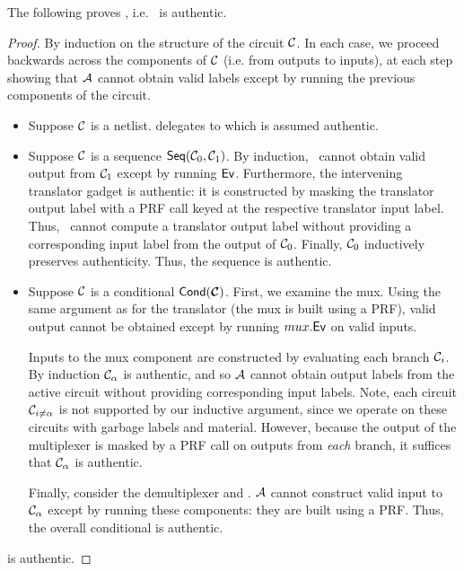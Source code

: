 The following proves , i.e. \ourschemelong\ is
authentic.
\begin{proof}
  By induction on the structure of the circuit $\mathcal C$.
  In each case, we proceed backwards across the components of $\mathcal C$ (i.e. from outputs to inputs), at
  each step showing that $\mathcal{A}$ cannot obtain valid labels
  except by running the previous components of the circuit.
  \begin{itemize}
    \item Suppose $\mathcal C$ is a netlist. \ourschemelong delegates to
      \underscheme which is assumed authentic.
    \item Suppose $\mathcal C$ is a sequence $\textsf{Seq}(\mathcal C_0, \mathcal C_1)$.
      By induction, \adv\ cannot obtain valid
      output from $\mathcal C_1$ except by running $\textsf{Ev}$.
      Furthermore, the intervening translator gadget is authentic: it
      is constructed by masking the translator output label with a PRF call
      keyed at the respective translator input label.
      Thus, \adv\ cannot compute a translator output label without providing
      a corresponding input label from the output of $\mathcal C_0$.
      Finally, $\mathcal C_0$ inductively preserves authenticity.
      Thus, the sequence is authentic.
    \item Suppose $\mathcal C$ is a conditional $\conditional(\vec{\cir})$.
      First, we examine the mux. Using the same argument as for the
      translator (the mux is built using a PRF), valid output cannot be obtained except by running $mux.\textsf{Ev}$ on valid inputs.

      Inputs to the mux component are constructed by evaluating
      each branch $\mathcal C_i$.
      By induction $\mathcal C_{\alpha}$ is authentic, and so $\mathcal{A}$ cannot
      obtain output labels from the active circuit without providing
      corresponding input labels.
      Note, each circuit $\mathcal C_{i \neq \alpha}$ is not supported by our
      inductive argument, since we operate on these circuits with
      garbage labels and material.
      However, because the output of the multiplexer is masked by a
      PRF call on outputs from \emph{each} branch, it suffices that
      $\mathcal C_{\alpha}$ is authentic.

      Finally, consider the demultiplexer and \gadget. $\mathcal{A}$ cannot construct valid
      input to $\mathcal C_{\alpha}$ except by running these components: they
      are built using a PRF.
      Thus, the overall conditional is authentic.
  \end{itemize}
  \ourscheme is authentic.
\end{proof}


